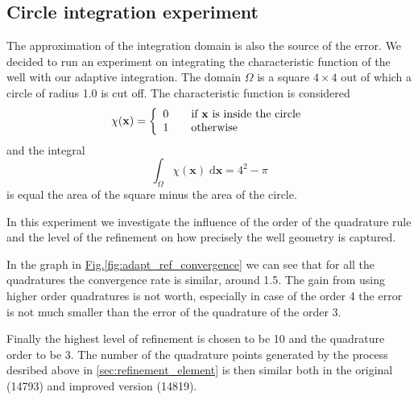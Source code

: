 \documentclass[preprint,12pt,authoryear]{elsarticle}
\newcommand{\fig}[1]{\hyperref[#1]{Fig.\ref{#1}}}
\newcommand{\dd}{\; \mathrm{d}}
\begin{document}
\subsection{Circle integration experiment}
The approximation of the integration domain is also the source of the error. We decided to run 
an experiment on integrating the characteristic function of the well with our adaptive integration.
The domain $\Omega$ is a square $4\times4$ out of which a circle of radius 1.0 is cut off. The characteristic 
function is considered
\begin{equation}
  \chi(\mathbf{x}) = \left\{
    \begin{array}{l l}
      0 & \quad \textrm{if } \mathbf{x} \textrm{ is inside the circle}\\
      1 & \quad \textrm{otherwise}
  \end{array} \right.
\end{equation}
and the integral 
\begin{equation}
  \int_{\Omega}\chi(\mathbf{x}) \dd\mathbf{x} = 4^2 - \pi
\end{equation}
is equal the area of the square minus the area of the circle.

In this experiment we investigate the influence of the order of the quadrature rule and the level of
the refinement on how precisely the well geometry is captured.

In the graph in \fig{fig:adapt_ref_convergence} we can see that for all the quadratures the convergence rate
is similar, around 1.5. The gain from using higher order quadratures is not worth, especially in case 
of the order 4 the error is not much smaller than the error of the quadrature of the order 3. 

Finally the highest level of refinement is chosen to be 10 and the quadrature order to be 3. The number of
the quadrature points generated by the process desribed above in \ref{sec:refinement_element} is then similar 
both in the original (14793) and improved version (14819).
\end{document}
